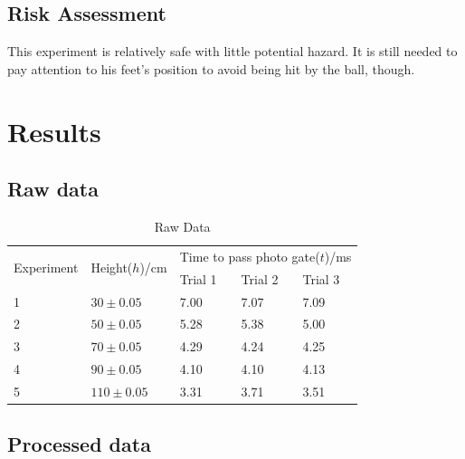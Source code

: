 \documentclass[a4paper]{article}
\begin{document}
\subsection{Risk Assessment}

This experiment is relatively safe with little potential hazard. It is still needed to pay attention to his feet's position to avoid being hit by the ball, though.

\section{Results}
    \subsection{Raw data}
    \begin{table}[ht!]\centering
        \caption{Raw Data}
        \begin{tabular}{|l|l|lll|}
        \hline
        \multirow{2}{*}{Experiment} & \multirow{2}{*}{Height($h$)/cm} & \multicolumn{3}{l|}{Time to pass photo gate($t$)/ms}                  \\ \cline{3-5} 
                                    &                                 & \multicolumn{1}{l|}{Trial 1} & \multicolumn{1}{l|}{Trial 2} & Trial 3 \\ \hline
        1                           & $30 \pm 0.05$                   & \multicolumn{1}{l|}{7.00}    & \multicolumn{1}{l|}{7.07}    & 7.09    \\ \hline
        2                           & $50 \pm 0.05$                   & \multicolumn{1}{l|}{5.28}    & \multicolumn{1}{l|}{5.38}    & 5.00    \\ \hline
        3                           & $70 \pm 0.05$                   & \multicolumn{1}{l|}{4.29}    & \multicolumn{1}{l|}{4.24}    & 4.25    \\ \hline
        4                           & $90 \pm 0.05$                   & \multicolumn{1}{l|}{4.10}    & \multicolumn{1}{l|}{4.10}    & 4.13    \\ \hline
        5                           & $110 \pm 0.05$                  & \multicolumn{1}{l|}{3.31}    & \multicolumn{1}{l|}{3.71}    & 3.51    \\ \hline
        \end{tabular}
    \end{table}
    \subsection{Processed data}
    
\end{document}
